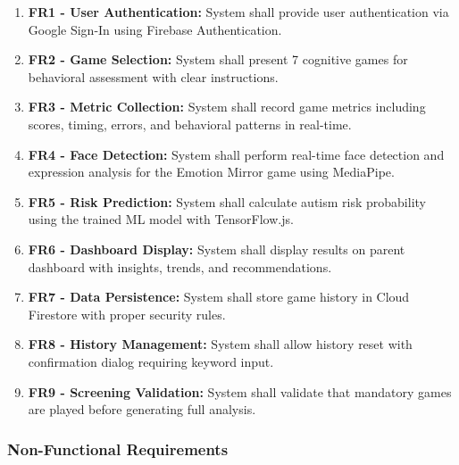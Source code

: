 \documentclass[12pt,letterpaper]{article}
\begin{document}
\begin{enumerate}
    \item \textbf{FR1 - User Authentication:} System shall provide user authentication via Google Sign-In using Firebase Authentication.
    
    \item \textbf{FR2 - Game Selection:} System shall present 7 cognitive games for behavioral assessment with clear instructions.
    
    \item \textbf{FR3 - Metric Collection:} System shall record game metrics including scores, timing, errors, and behavioral patterns in real-time.
    
    \item \textbf{FR4 - Face Detection:} System shall perform real-time face detection and expression analysis for the Emotion Mirror game using MediaPipe.
    
    \item \textbf{FR5 - Risk Prediction:} System shall calculate autism risk probability using the trained ML model with TensorFlow.js.
    
    \item \textbf{FR6 - Dashboard Display:} System shall display results on parent dashboard with insights, trends, and recommendations.
    
    \item \textbf{FR7 - Data Persistence:} System shall store game history in Cloud Firestore with proper security rules.
    
    \item \textbf{FR8 - History Management:} System shall allow history reset with confirmation dialog requiring keyword input.
    
    \item \textbf{FR9 - Screening Validation:} System shall validate that mandatory games are played before generating full analysis.
\end{enumerate}

\subsubsection{Non-Functional Requirements}
\end{document}
